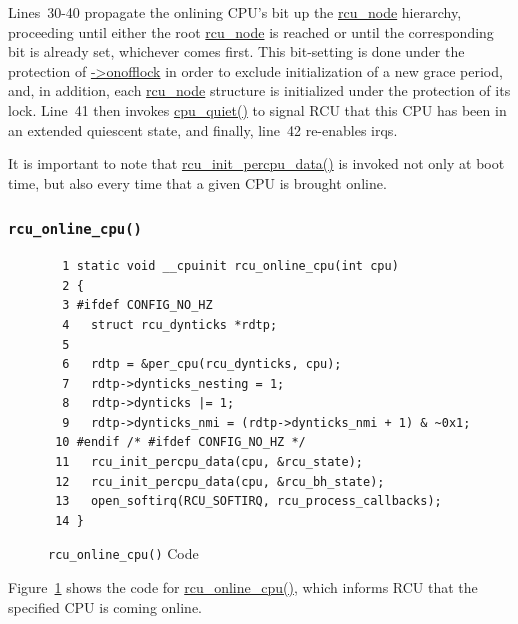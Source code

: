 Lines~30-40 propagate the onlining CPU's bit up the \url{rcu_node}
hierarchy, proceeding until either the root \url{rcu_node} is
reached or until the corresponding bit is already set, whichever
comes first.
This bit-setting is done under the protection of \url{->onofflock}
in order to exclude initialization of a new grace period, and, in addition,
each \url{rcu_node} structure is initialized under the protection
of its lock.
Line~41 then invokes \url{cpu_quiet()} to signal RCU that this
CPU has been in an extended quiescent state, and finally, line~42
re-enables irqs.

 \QuickQuizEnd

It is important to note that \url{rcu_init_percpu_data()} is invoked
not only at boot time, but also every time that a given CPU is brought
online.

\subsubsection{\tt rcu\_online\_cpu()}
\label{app:rcuimpl:rcutreewt:rcu-online-cpu}

\begin{figure}[tbp]
{ \scriptsize
\begin{verbatim}
  1 static void __cpuinit rcu_online_cpu(int cpu)
  2 {
  3 #ifdef CONFIG_NO_HZ
  4   struct rcu_dynticks *rdtp;
  5 
  6   rdtp = &per_cpu(rcu_dynticks, cpu);
  7   rdtp->dynticks_nesting = 1;
  8   rdtp->dynticks |= 1;
  9   rdtp->dynticks_nmi = (rdtp->dynticks_nmi + 1) & ~0x1;
 10 #endif /* #ifdef CONFIG_NO_HZ */
 11   rcu_init_percpu_data(cpu, &rcu_state);
 12   rcu_init_percpu_data(cpu, &rcu_bh_state);
 13   open_softirq(RCU_SOFTIRQ, rcu_process_callbacks);
 14 }
\end{verbatim}
}
\caption{{\tt rcu\_online\_cpu()} Code}
\label{fig:app:rcuimpl:rcutreewt:Code for rcu-online-cpu}
\end{figure}

Figure~\ref{fig:app:rcuimpl:rcutreewt:Code for rcu-online-cpu}
shows the code for \url{rcu_online_cpu()}, which informs RCU that the
specified CPU is coming online.

